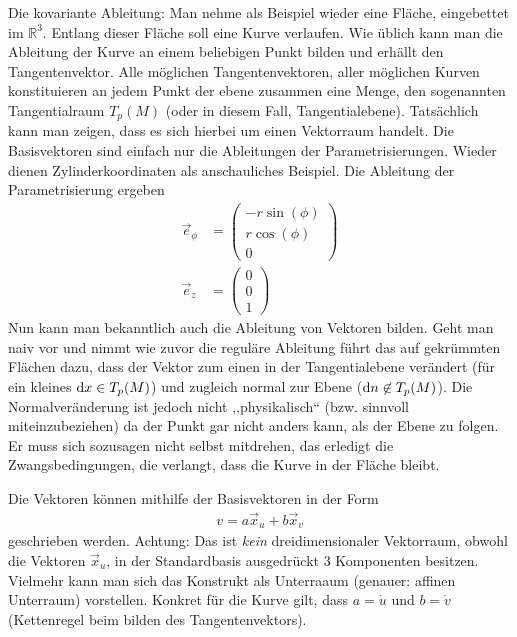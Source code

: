 \documentclass{scrartcl}
\begin{document}
		\begin{paragraph}{Die kovariante Ableitung:}
			Man nehme als Beispiel wieder eine Fläche, eingebettet im $\mathbb{R}^3$. Entlang dieser Fläche soll eine Kurve verlaufen. Wie üblich 
			kann man die Ableitung der Kurve an einem beliebigen Punkt bilden und erhällt den Tangentenvektor. Alle möglichen Tangentenvektoren,
			aller möglichen Kurven konstituieren an jedem Punkt der ebene zusammen eine Menge, den sogenannten Tangentialraum $T_p(M)$
			(oder in diesem Fall, Tangentialebene). Tatsächlich kann man zeigen, dass es sich hierbei um einen Vektorraum handelt. Die Basisvektoren
			sind einfach nur die Ableitungen der Parametrisierungen. Wieder dienen Zylinderkoordinaten als anschauliches Beispiel. 
			Die Ableitung der Parametrisierung ergeben
			\begin{align*}
				\vec{e}_\phi&=\left(\begin{array}{c} -r\sin(\phi)\\ r\cos(\phi)\\ 0\end{array}\right)\\
				\vec{e}_z&=\left(\begin{array}{c} 0\\0\\1\end{array}\right)
			\end{align*}
			Nun kann man bekanntlich auch die Ableitung von Vektoren bilden. Geht man naiv vor und nimmt wie zuvor die reguläre Ableitung 
			führt das auf gekrümmten Flächen dazu, dass der Vektor zum einen in der Tangentialebene verändert (für ein kleines ${\rm d}x\in T_p(M)$)
			und zugleich normal zur Ebene (${\rm d}n\not \in T_p(M)$). Die Normalveränderung ist jedoch nicht ,,physikalisch`` (bzw. sinnvoll miteinzubeziehen)
			da der Punkt gar nicht anders kann, als der Ebene zu folgen. Er muss sich sozusagen nicht selbst mitdrehen, das erledigt die Zwangsbedingungen,
			die verlangt, dass die Kurve in der Fläche bleibt.
			
			Die Vektoren können mithilfe der Basisvektoren in der Form
			\begin{align}
				v=a\vec{x}_u+b\vec{x}_v
			\end{align}
			geschrieben werden. Achtung: Das ist \textit{kein} dreidimensionaler Vektorraum, obwohl die Vektoren $\vec{x}_u$, in der Standardbasis ausgedrückt 3 Komponenten
			besitzen. Vielmehr kann man sich das Konstrukt als Unterraaum (genauer: affinen Unterraum) vorstellen. Konkret für die Kurve gilt, dass $a=\dot{u}$ und
			$b=\dot{v}$ (Kettenregel beim bilden des Tangentenvektors).
			

\end{paragraph}
\end{document}
